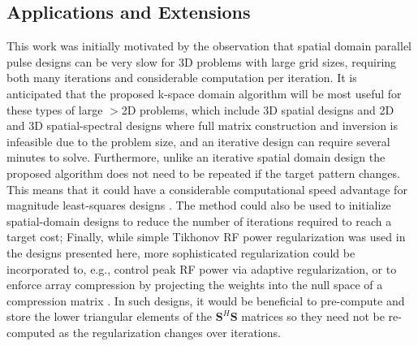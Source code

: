 \subsection*{Applications and Extensions}
This work was initially motivated by the observation that spatial domain parallel pulse designs can be very slow
for 3D problems with large grid sizes, 
requiring both many iterations and considerable computation per iteration. 
It is anticipated that the proposed k-space domain algorithm will be most useful for these types of large $>$2D problems,
which include 3D spatial designs \cite{malik2012tailored} and 2D and 3D spatial-spectral designs \cite{stenger2000three,yang2010four,davids2016fast}
where full matrix construction and inversion is infeasible due to the problem size,
and an iterative design can require several minutes to solve. 
Furthermore, unlike an iterative spatial domain design the proposed algorithm does not need to be repeated if the target pattern changes.
This means that it could have a considerable computational speed advantage for magnitude least-squares designs \cite{setsompop2008magnitude,malik:mrm:2015}. 
The method could also be used to initialize spatial-domain designs to reduce the number of iterations required to reach a target cost; 
Finally, while simple Tikhonov RF power regularization was used in the designs presented here,
more sophisticated regularization could be incorporated to, e.g., control peak RF power via adaptive regularization,
or to enforce array compression by projecting the weights into the null space of a compression matrix .
In such designs, it would be beneficial to pre-compute and store the lower triangular elements of the $\bm{S}^H\bm{S}$ matrices
so they need not be re-computed as the regularization changes over iterations.  

